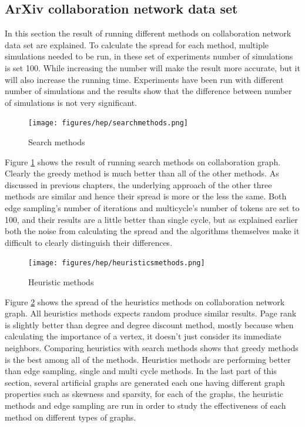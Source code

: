 \documentclass[english]{tktltiki}
\begin{document}
\subsection{ArXiv collaboration network data set} 
In this section the result of running different methods on collaboration network data set are explained. To calculate the spread for each method, multiple simulations needed to be run, in these set of experiments number of simulations is set 100. While increasing the number will make the result more accurate, but it will also increase the running time. Experiments have been run with different number of simulations and the results show that the difference between number of simulations is not very significant. 
\begin{figure}[ht!]
\centering
\texttt{[image: figures/hep/searchmethods.png]}
\caption{Search methods}
\label{hep:searchmethods}
\end{figure}
Figure \ref{hep:searchmethods} shows the result of running search methods on collaboration graph. Clearly the greedy method is much better than all of the other methods. As discussed in previous chapters, the underlying approach of the other three methods are similar and hence their spread is more or the less the same. Both edge sampling's number of iterations and multicycle's number of tokens are set to 100, and their results are a little better than single cycle, but as explained earlier both the noise from calculating the spread and the algorithms themselves make it difficult to clearly distinguish their differences.
\begin{figure}[ht!]
\centering
\texttt{[image: figures/hep/heuristicsmethods.png]}
\caption{Heuristic methods}
\label{hep:heuristicmethods}
\end{figure}
Figure \ref{hep:heuristicmethods} shows the spread of the heuristics methods on collaboration network graph.  All heuristics methods expects random produce similar results. Page rank is slightly better than degree and degree discount method, mostly because when calculating the importance of a vertex, it doesn't just consider its immediate neighbors. Comparing heuristics with search methods shows that greedy methods is the best among all of the methods. Heuristics methods are performing better than edge sampling, single and multi cycle methods. In the last part of this section, several artificial graphs are generated each one having different graph properties such as skewness and sparsity, for each of the graphs, the heuristic methods and edge sampling are run in order to study the effectiveness of each method on different types of graphs.
\end{document}
